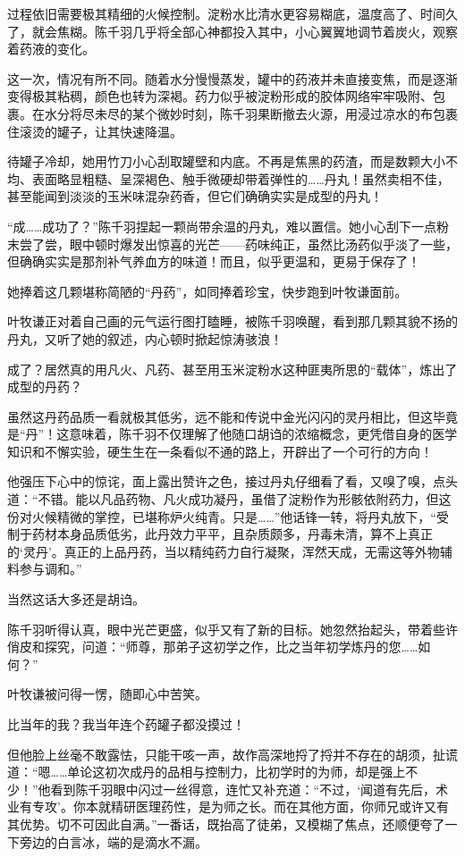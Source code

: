 过程依旧需要极其精细的火候控制。淀粉水比清水更容易糊底，温度高了、时间久了，就会焦糊。陈千羽几乎将全部心神都投入其中，小心翼翼地调节着炭火，观察着药液的变化。

这一次，情况有所不同。随着水分慢慢蒸发，罐中的药液并未直接变焦，而是逐渐变得极其粘稠，颜色也转为深褐。药力似乎被淀粉形成的胶体网络牢牢吸附、包裹。在水分将尽未尽的某个微妙时刻，陈千羽果断撤去火源，用浸过凉水的布包裹住滚烫的罐子，让其快速降温。

待罐子冷却，她用竹刀小心刮取罐壁和内底。不再是焦黑的药渣，而是数颗大小不均、表面略显粗糙、呈深褐色、触手微硬却带着弹性的……丹丸！虽然卖相不佳，甚至能闻到淡淡的玉米味混杂药香，但它们确确实实是成型的丹丸！

“成……成功了？”陈千羽捏起一颗尚带余温的丹丸，难以置信。她小心刮下一点粉末尝了尝，眼中顿时爆发出惊喜的光芒——药味纯正，虽然比汤药似乎淡了一些，但确确实实是那剂补气养血方的味道！而且，似乎更温和，更易于保存了！

她捧着这几颗堪称简陋的“丹药”，如同捧着珍宝，快步跑到叶牧谦面前。

叶牧谦正对着自己画的元气运行图打瞌睡，被陈千羽唤醒，看到那几颗其貌不扬的丹丸，又听了她的叙述，内心顿时掀起惊涛骇浪！

成了？居然真的用凡火、凡药、甚至用玉米淀粉水这种匪夷所思的“载体”，炼出了成型的丹药？

虽然这丹药品质一看就极其低劣，远不能和传说中金光闪闪的灵丹相比，但这毕竟是“丹”！这意味着，陈千羽不仅理解了他随口胡诌的浓缩概念，更凭借自身的医学知识和不懈实验，硬生生在一条看似不通的路上，开辟出了一个可行的方向！

他强压下心中的惊诧，面上露出赞许之色，接过丹丸仔细看了看，又嗅了嗅，点头道：“不错。能以凡品药物、凡火成功凝丹，虽借了淀粉作为形骸依附药力，但这份对火候精微的掌控，已堪称炉火纯青。只是……”他话锋一转，将丹丸放下，“受制于药材本身品质低劣，此丹效力平平，且杂质颇多，丹毒未清，算不上真正的‘灵丹’。真正的上品丹药，当以精纯药力自行凝聚，浑然天成，无需这等外物辅料参与调和。”

当然这话大多还是胡诌。

陈千羽听得认真，眼中光芒更盛，似乎又有了新的目标。她忽然抬起头，带着些许俏皮和探究，问道：“师尊，那弟子这初学之作，比之当年初学炼丹的您……如何？”

叶牧谦被问得一愣，随即心中苦笑。

比当年的我？我当年连个药罐子都没摸过！

但他脸上丝毫不敢露怯，只能干咳一声，故作高深地捋了捋并不存在的胡须，扯谎道：“嗯……单论这初次成丹的品相与控制力，比初学时的为师，却是强上不少！”他看到陈千羽眼中闪过一丝得意，连忙又补充道：“不过，‘闻道有先后，术业有专攻’。你本就精研医理药性，是为师之长。而在其他方面，你师兄或许又有其优势。切不可因此自满。”一番话，既抬高了徒弟，又模糊了焦点，还顺便夸了一下旁边的白言冰，端的是滴水不漏。

